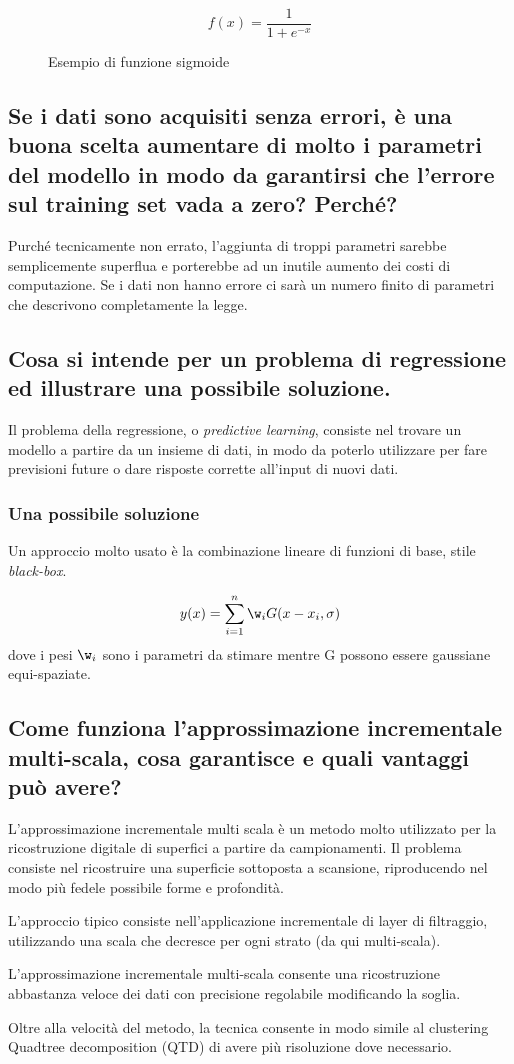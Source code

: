 \documentclass[\main/main.tex]{subfiles}
\begin{document}
\begin{figure}
  \[
    f(x) = \frac{1}{1+e^{-x}}
  \]
  \caption{Esempio di funzione sigmoide}
\end{figure}

\subsection{Se i dati sono acquisiti senza errori, è una buona scelta aumentare di molto i parametri del modello in modo da garantirsi che l'errore sul training set vada a zero? Perché?}
Purché tecnicamente non errato, l'aggiunta di troppi parametri sarebbe semplicemente superflua e porterebbe ad un inutile aumento dei costi di computazione. Se i dati non hanno errore ci sarà un numero finito di parametri che descrivono completamente la legge.

\subsection{Cosa si intende per un problema di regressione ed illustrare una possibile soluzione.}
Il problema della regressione, o \textit{predictive learning}, consiste nel trovare un modello a partire da un insieme di dati, in modo da poterlo utilizzare per fare previsioni future o dare risposte corrette all'input di nuovi dati.
\subsubsection*{Una possibile soluzione}
Un approccio molto usato è la combinazione lineare di funzioni di base, stile \textit{black-box}.

\[
  y(x) = \sum_{i=1}^n \w_i G(x-x_i, \sigma)
\]
dove i pesi $\w_i$ sono i parametri da stimare mentre G possono essere gaussiane equi-spaziate.

\subsection{Come funziona l'approssimazione incrementale multi-scala, cosa garantisce e quali vantaggi può avere?}
L'approssimazione incrementale multi scala è un metodo molto utilizzato per la ricostruzione digitale di superfici a partire da campionamenti. Il problema consiste nel ricostruire una superficie sottoposta a scansione, riproducendo nel modo più fedele possibile forme e profondità.

L'approccio tipico consiste nell'applicazione incrementale di layer di filtraggio, utilizzando una scala che decresce per ogni strato (da qui multi-scala).

L'approssimazione incrementale multi-scala consente una ricostruzione abbastanza veloce dei dati con precisione regolabile modificando la soglia.

Oltre alla velocità del metodo, la tecnica consente in modo simile al clustering Quadtree decomposition (QTD) di avere più risoluzione dove necessario.
\end{document}

